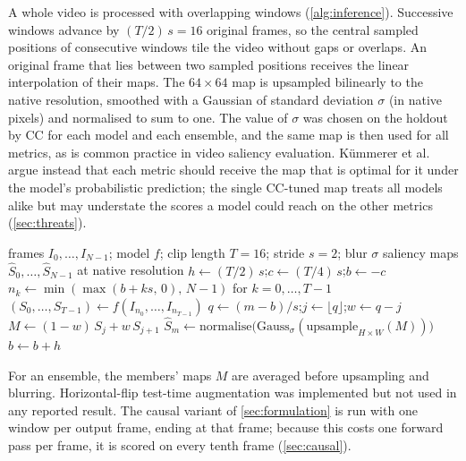 A whole video is processed with overlapping windows
(\cref{alg:inference}). Successive windows advance by $(T/2)\,s=16$ original
frames, so the central sampled positions of consecutive windows tile the
video without gaps or overlaps. An original frame that lies between two
sampled positions receives the linear interpolation of their maps. The
$64\times64$ map is upsampled bilinearly to the native resolution, smoothed
with a Gaussian of standard deviation $\sigma$ (in native pixels) and
normalised to sum to one. The value of $\sigma$ was chosen on the holdout by
\acrshort{CC} for each model and each ensemble, and the same map is then used for all
metrics, as is common practice in video saliency evaluation. K\"ummerer et
al.~\cite{kummerer2018saliency} argue instead that each metric should receive
the map that is optimal for it under the model's probabilistic prediction; the
single \acrshort{CC}-tuned map treats all models alike but may understate the scores a
model could reach on the other metrics (\cref{sec:threats}).

\begin{algorithm}[htbp]
  \caption{Whole-video inference with SURGE-D}\label{alg:inference}
  \begin{algorithmic}[1]
    \Require frames $I_0,\dots,I_{N-1}$; model $f$; clip length $T=16$; stride $s=2$; blur $\sigma$
    \Ensure saliency maps $\hat S_0,\dots,\hat S_{N-1}$ at native resolution
    \State $h \gets (T/2)\,s$;\quad $c \gets (T/4)\,s$;\quad $b \gets -c$ 
      \State $n_k \gets \min(\max(b+ks,\,0),\,N-1)$ for $k=0,\dots,T-1$ 
      \State $(S_0,\dots,S_{T-1}) \gets f(I_{n_0},\dots,I_{n_{T-1}})$ 
        \State $q \gets (m-b)/s$;\quad $j \gets \lfloor q\rfloor$;\quad $w \gets q-j$
        \State $M \gets (1-w)\,S_j + w\,S_{j+1}$ 
        \State $\hat S_m \gets \mathrm{normalise}\big(\mathrm{Gauss}_\sigma(\mathrm{upsample}_{H\times W}(M))\big)$
      \EndFor
      \State $b \gets b + h$
    \EndWhile
  \end{algorithmic}
\end{algorithm}

For an ensemble, the members' maps $M$ are averaged before upsampling and
blurring. Horizontal-flip test-time augmentation was implemented but not used
in any reported result. The causal variant of \cref{sec:formulation} is run with
one window per output frame, ending at that frame; because this costs one
forward pass per frame, it is scored on every tenth frame (\cref{sec:causal}).

